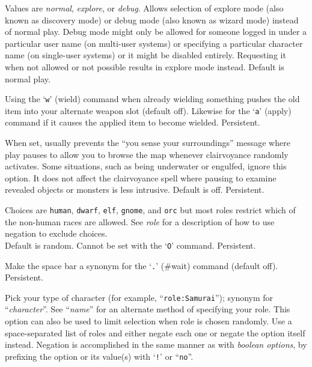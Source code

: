 \item[\ib{playmode}]
Values are {\it normal\/}, {\it explore\/}, or {\it debug\/}.
Allows selection of explore mode (also known as discovery mode) or debug
mode (also known as wizard mode) instead of normal play.
Debug mode might only be allowed for someone logged in under a particular
user name (on multi-user systems) or specifying a particular character
name (on single-user systems) or it might be disabled entirely.  Requesting
it when not allowed or not possible results in explore mode instead.
Default is normal play.
\item[\ib{pushweapon}]
Using the `{\tt w}' (wield) command when already wielding
something pushes the old item into your alternate weapon slot (default off).
Likewise for the `{\tt a}' (apply) command if it causes the applied item to
become wielded.  Persistent.
\item[\ib{quick\verb+_+farsight}]
When set, usually prevents the ``you sense your surroundings'' message
where play pauses to allow you to browse the map whenever clairvoyance
randomly activates.
Some situations, such as being underwater or engulfed, ignore this option.
It does not affect the clairvoyance spell where pausing to examine revealed
objects or monsters is less intrusive.
Default is off.  Persistent.
\item[\ib{race}]
Choices are {\tt human}, {\tt dwarf}, {\tt elf}, {\tt gnome}, and
{\tt orc} but most roles restrict which of the non-human races are allowed.
See {\it role\/}
for a description of how to use negation to exclude choices.
\\
Default is random.
Cannot be set with the `{\tt O}' command.  Persistent.
\item[\ib{rest\verb+_+on\verb+_+space}]
Make the space bar a synonym for the `{\tt .}' (\#wait) command (default off).
Persistent.
\item[\ib{role}]
Pick your type of character (for example, ``{\tt role:Samurai}'');
synonym for ``{\it character\/}''.
See ``{\it name\/}'' for an alternate method of specifying your role.
This option can also be used to limit selection when role is chosen
randomly.
Use a space-separated list of roles and either negate each one or negate
the option itself instead.
Negation is accomplished in the same manner as with {\it boolean options\/},
by prefixing the option or its value(s) with `{\tt \verb+!+}' or ``{\tt no}''.
